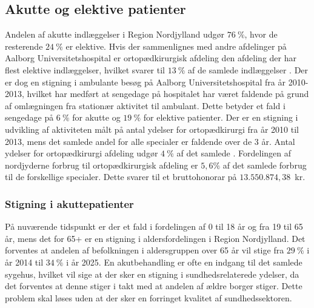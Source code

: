 \subsection{Akutte og elektive patienter}
Andelen af akutte indlæggelser i Region Nordjylland udgør $76~\%$, hvor de resterende $24~\%$ er elektive. Hvis der sammenlignes med andre afdelinger på Aalborg Universitetshospital er ortopædkirurgisk afdeling den afdeling der har flest elektive indlæggelser, hvilket svarer til $13~\%$ af de samlede indlæggelser . Der er dog en stigning i ambulante besøg på Aalborg Universitetshospital fra år 2010-2013, hvilket har medført at sengedage på hospitalet har været faldende på grund af omlægningen fra stationær aktivitet til ambulant. Dette betyder et fald i sengedage på $6~\%$ for akutte og $19~\%$ for elektive patienter. Der er en stigning i udvikling af aktiviteten målt på antal ydelser for ortopædkirurgi fra år 2010 til 2013, mens det samlede andel for alle specialer er faldende over de 3 år. Antal ydelser for ortopædkirurgi afdeling udgør $4~\%$ af det samlede . Fordelingen af nordjyderne forbrug til ortopædkirurgisk afdeling er $5,6\%$ af det samlede forbrug til de forskellige specialer. Dette svarer til et bruttohonorar på $13.550.874,38$~kr. \cite{RegionNord2016}

\subsubsection{Stigning i akuttepatienter}
På nuværende tidspunkt er der et fald i fordelingen af 0 til 18 år og fra 19 til 65 år, mens det for 65+ er en stigning i aldersfordelingen i Region Nordjylland. Det forventes at andelen af befolkningen i aldersgruppen over 65 år vil stige fra $29~\%$ i år 2014 til $34~\%	$ i år 2025. En akutbehandling er ofte en indgang til det samlede sygehus, hvilket vil sige at der sker en stigning i sundhedsrelaterede ydelser, da det forventes at denne stiger i takt med at andelen af ældre borger stiger. Dette problem skal løses uden at der sker en forringet kvalitet af sundhedssektoren. 
